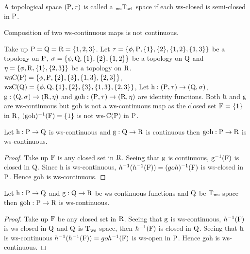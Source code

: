 \begin{dfn}\label{defi3.2.4}
A topological space $(\mathrm{P},\tau)$ is called a $_{\text{ws}}\mathrm{T}_{\mathrm{scl}}$ space if each ws-closed is semi-closed in $\mathrm{P}$.
\end{dfn}

\begin{rem}\label{rem3.2.3}
Composition of two ws-continuous maps is not continuous.
\end{rem}

\begin{exm}\label{exam3.2.9}
Take up $\mathrm{P}=\mathrm{Q}=\mathrm{R}= \{1, 2, 3\}$. Let $\tau = \{\phi, \TSP, \{1\}, \{2\}, \{1, 2\},\break \{1, 3\}\}$ be a topology on $\mathrm{P}$, $\sigma = \{\phi, \mathrm{Q}, \{1\},\{2\}, \{1, 2\}\}$ be a topology on $\mathrm{Q}$ and $\eta=\{\phi, \mathrm{R}, \{1\}, \{2, 3\}\}$ be a topology on $\mathrm{R}$. $\mathrm{ws}\mathrm{C}(\mathrm{P})= \{\phi, \mathrm{P}, \{2\}, \{3\}, \{1, 3\},\{2,3\}\}$, $\mathrm{ws}\mathrm{C}(\mathrm{Q})= \{\phi, \mathrm{Q}, \{1\},\{2\}, \{3\}, \{1, 3\},\{2,3\}\}$, Let $\mathrm{h}: (\mathrm{P}, \tau )\to (\mathrm{Q}, \sigma)$, $\mathrm{g}: (\mathrm{Q}, \sigma)\to (\mathrm{R}, \eta)$ and $\text{goh}:(\mathrm{P}, \tau )\to (\mathrm{R}, \eta)$ are identity functions. Both $\mathrm{h}$ and $\mathrm{g}$ are ws-continuous but goh is not a ws-continuous map as the closed set $\mathrm{F}=\{1\}$ in $\mathrm{R}$, $(\text{goh})^{-1} (\mathrm{F})=\{1\}$ is not ws-$\mathrm{C}(\mathrm{P})$ in $\mathrm{P}$.
\end{exm}

\begin{thm}\label{thm3.2.9}
Let $\mathrm{h}: \mathrm{P}\to \mathrm{Q}$ is ws-continuous and $\mathrm{g}: \mathrm{Q}\to \mathrm{R}$ is continuous then $\text{goh}: \mathrm{P}\to \mathrm{R}$ is ws-continuous.
\end{thm}

\begin{proof}
Take up $\mathrm{F}$ is any closed set in $\mathrm{R}$. Seeing that $\mathrm{g}$ is continuous, $\mathrm{g}^{-1}(\mathrm{F})$ is closed in $\mathrm{Q}$. Since h is ws-continuous, $h^{-1}(h^{-1}(\mathrm{F})) =(goh)^{-1}(\mathrm{F})$ is ws-closed in $\mathrm{P}$. Hence goh is ws-continuous. 
\end{proof}

\begin{thm}\label{thm3.2.10}
Let $\mathrm{h}: \mathrm{P}\to \mathrm{Q}$ and $\mathrm{g}: \mathrm{Q}\to \mathrm{R}$ be ws-continuous functions and $\mathrm{Q}$ be $\mathrm{T}_{\text{ws}}$ space then $\text{goh}: \mathrm{P}\to \mathrm{R}$ is ws-continuous.
\end{thm}

\begin{proof}
Take up $\mathrm{F}$ be any closed set in $\mathrm{R}$. Seeing that $\mathrm{g}$ is ws-continuous, $h^{-1}(\mathrm{F})$ is ws-closed in $\mathrm{Q}$ and $\mathrm{Q}$ is $\mathrm{T}_{\mathrm{ws}}$ space, then $h^{-1}(\mathrm{F})$ is closed in $\mathrm{Q}$. Seeing that $\mathrm{h}$ is ws-continuous $h^{-1} (h^{-1}(\mathrm{F}))= goh^{-1} (\mathrm{F})$ is ws-open in $\mathrm{P}$. Hence goh is ws-continuous.
\end{proof}

